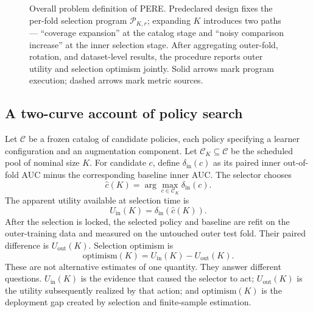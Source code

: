 \documentclass[referee]{USG}
\newcommand{\optm}{\ensuremath{\mathrm{optimism}}}
\newcommand{\uinner}{\ensuremath{U_{\mathrm{in}}}}
\newcommand{\uouter}{\ensuremath{U_{\mathrm{out}}}}
\begin{document}
\begin{figure}[t]
\caption{Overall problem definition of PERE. Predeclared design fixes the per-fold selection program $\mathcal P_{K,r}$; expanding $K$ introduces two paths --- ``coverage expansion'' at the catalog stage and ``noisy comparison increase'' at the inner selection stage. After aggregating outer-fold, rotation, and dataset-level results, the procedure reports outer utility and selection optimism jointly. Solid arrows mark program execution; dashed arrows mark metric sources.}
\label{fig:pere_definition}
\end{figure}

\subsection{A two-curve account of policy search}
Let $\mathcal{C}$ be a frozen catalog of candidate policies, each policy specifying a learner configuration and an augmentation component. Let $\mathcal{C}_K\subseteq\mathcal{C}$ be the scheduled pool of nominal size $K$. For candidate $c$, define $\delta_{\mathrm{in}}(c)$ as its paired inner out-of-fold AUC minus the corresponding baseline inner AUC. The selector chooses
\begin{equation}
 \hat c(K)=\arg\max_{c\in\mathcal{C}_K}\delta_{\mathrm{in}}(c).
\end{equation}
The apparent utility available at selection time is
\begin{equation}
 \uinner(K)=\delta_{\mathrm{in}}(\hat c(K)).
\end{equation}
After the selection is locked, the selected policy and baseline are refit on the outer-training data and measured on the untouched outer test fold. Their paired difference is $\uouter(K)$. Selection optimism is
\begin{equation}
 \optm(K)=\uinner(K)-\uouter(K).
\end{equation}
These are not alternative estimates of one quantity. They answer different questions. $\uinner(K)$ is the evidence that caused the selector to act; $\uouter(K)$ is the utility subsequently realized by that action; and $\optm(K)$ is the deployment gap created by selection and finite-sample estimation.
\end{document}

